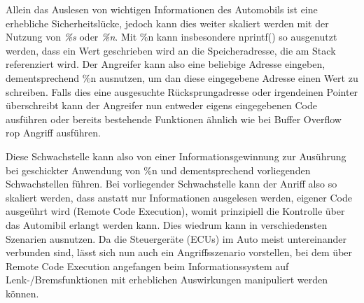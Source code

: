 \documentclass[a4paper,
DIV=13,
12pt,
BCOR=10mm,
department=FakIM,
oneside,
parskip=half,
automark,
listof=totocnumbered,
bibliography=totocnumbered,
acronym=totocnumbered
] {OTHRartcl}
\begin{document}
Allein das Auslesen von wichtigen Informationen des Automobils ist eine erhebliche Sicherheitslücke, jedoch kann dies weiter skaliert werden mit der Nutzung von \textit{\%s} oder \textit{\%n}.
Mit \%n kann insbesondere nprintf() so ausgenutzt werden, dass ein Wert geschrieben wird an die Speicheradresse, die am Stack referenziert wird.
Der Angreifer kann also eine beliebige Adresse eingeben, dementsprechend \%n ausnutzen, um dan diese eingegebene Adresse einen Wert zu schreiben.
Falls dies eine ausgesuchte Rücksprungadresse oder irgendeinen Pointer überschreibt kann der Angreifer nun entweder eigens eingegebenen Code ausführen oder bereits bestehende Funktionen
ähnlich wie bei Buffer Overflow \ac*{rop} Angriff ausführen.

Diese Schwachstelle kann also von einer Informationsgewinnung zur Ausührung  bei geschickter Anwendung von \%n und dementsprechend vorliegenden Schwachstellen führen.
Bei vorliegender Schwachstelle kann der Anriff also so skaliert werden, dass anstatt nur Informationen ausgelesen werden, eigener Code ausgeührt wird (Remote Code Execution),
womit prinzipiell die Kontrolle über das Automibil erlangt werden kann. Dies wiedrum kann in verschiedensten Szenarien ausnutzen.
Da die Steuergeräte (ECUs) im Auto meist untereinander verbunden sind, lässt sich nun auch ein Angriffsszenario vorstellen, bei dem über Remote Code Execution angefangen beim
Informationssystem auf Lenk-/Bremsfunktionen mit erheblichen Auswirkungen manipuliert werden können.

\end{document}
